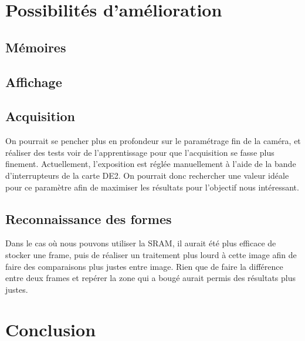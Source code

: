 \documentclass[10pt,a4paper]{report}
\begin{document}
\chapter{Possibilités d'amélioration}

\section{Mémoires}

\section{Affichage}



\section{Acquisition}

On pourrait se pencher plus en profondeur sur le paramétrage fin de la caméra, et réaliser des tests voir de l'apprentissage pour que l'acquisition se fasse plus finement. Actuellement, l'exposition est réglée manuellement à l'aide de la bande d'interrupteurs de la carte DE2. On pourrait donc rechercher une valeur idéale pour ce paramètre afin de maximiser les résultats pour l'objectif nous intéressant.

\section{Reconnaissance des formes}

Dans le cas où nous pouvons utiliser la SRAM, il aurait été plus efficace de stocker une frame, puis de réaliser un traitement plus lourd à cette image afin de faire des comparaisons plus justes entre image. Rien que de faire la différence entre deux frames et repérer la zone qui a bougé aurait permis des résultats plus justes.

\chapter{Conclusion}
\end{document}
